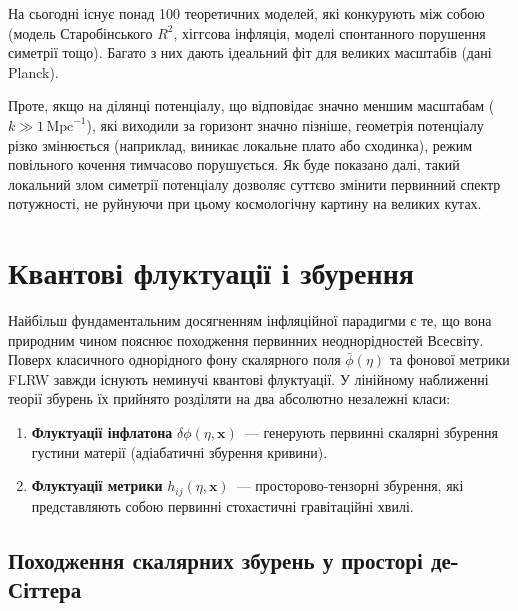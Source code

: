 \documentclass[12pt, a4paper]{article}
\begin{document}
На сьогодні існує понад 100 теоретичних моделей, які конкурують між собою (модель Старобінського $R^2$, хіггсова інфляція, моделі спонтанного порушення симетрії тощо). Багато з них дають ідеальний фіт для великих масштабів (дані Planck).

Проте, якщо на ділянці потенціалу, що відповідає значно меншим масштабам ($k \gg 1 \, \mathrm{Mpc}^{-1}$), які виходили за горизонт значно пізніше, геометрія потенціалу різко змінюється (наприклад, виникає локальне плато або сходинка), режим повільного кочення тимчасово порушується. Як буде показано далі, такий локальний злом симетрії потенціалу дозволяє суттєво змінити первинний спектр потужності, не руйнуючи при цьому космологічну картину на великих кутах.

\section{Квантові флуктуації і збурення}

Найбільш фундаментальним досягненням інфляційної парадигми є те, що вона природним чином пояснює походження первинних неоднорідностей Всесвіту. Поверх класичного однорідного фону скалярного поля $\bar{\phi}(\eta)$ та фонової метрики FLRW завжди існують неминучі квантові флуктуації. У лінійному наближенні теорії збурень їх прийнято розділяти на два абсолютно незалежні класи:
\begin{enumerate}
  \item \textbf{Флуктуації інфлатона} $\delta\phi(\eta, \mathbf{x})$~--- генерують первинні скалярні збурення густини матерії (адіабатичні збурення кривини).
  \item \textbf{Флуктуації метрики} $h_{ij}(\eta, \mathbf{x})$~--- просторово-тензорні збурення, які представляють собою первинні стохастичні гравітаційні хвилі.
\end{enumerate}

\subsection{Походження скалярних збурень у просторі де-Сіттера}
\end{document}
